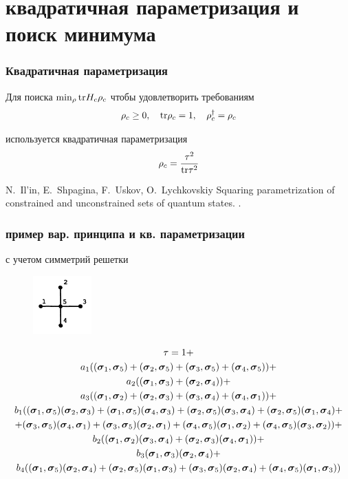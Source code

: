 \documentclass{beamer}
\begin{document}
\section{квадратичная параметризация и поиск минимума}
\begin{frame}
\frametitle{Квадратичная параметризация}
Для поиска $\min_\rho \tr H_c\rho_c$ чтобы удовлетворить требованиям 
$$\rho_c \geq 0,\quad \tr \rho_c=1, \quad \rho_c^\dagger=\rho_c$$ 

используется квадратичная параметризация 
$$\rho_c = \frac{\tau^2}{\tr \tau^2}$$

\footnotesize{
\begin{thebibliography}{99}
N.~Il'in, E.~Shpagina, F.~Uskov, O.~Lychkovskiy
\newblock Squaring parametrization of constrained and
  unconstrained sets of quantum states.
.
\end{thebibliography}
}

\end{frame}
\begin{frame}
\frametitle{пример вар. принципа и кв. параметризации}
с учетом симметрий решетки
\begin{figure}
\includegraphics[width=0.2\textwidth]{cluster-crest.png}
\end{figure}

\small
$$\begin{gathered}
\tau=1 + \\
a_1 ((\cc_1, \cc_5) + (\cc_2, \cc_5) + (\cc_3, \cc_5) + (\cc_4, \cc_5)) + \\
a_2 ((\cc_1, \cc_3) + (\cc_2, \cc_4)) + \\
a_3 ((\cc_1, \cc_2) + (\cc_2, \cc_3) + (\cc_3, \cc_4) + (\cc_4, \cc_1)) + \\
b_1 ((\cc_1, \cc_5) (\cc_2, \cc_3) + (\cc_1, \cc_5) (\cc_4, \cc_3) + (\cc_2, \cc_5) (\cc_3, \cc_4) + (\cc_2, \cc_5) (\cc_1, \cc_4) + \\
+ (\cc_3, \cc_5) (\cc_4, \cc_1) + (\cc_3, \cc_5) (\cc_2, \cc_1) + (\cc_4, \cc_5) (\cc_1, \cc_2) + (\cc_4, \cc_5) (\cc_3, \cc_2)) + \\
b_2 ((\cc_1, \cc_2) (\cc_3, \cc_4) + (\cc_2, \cc_3) (\cc_4, \cc_1)) + \\
b_3 (\cc_1, \cc_3) (\cc_2, \cc_4) + \\
b_4 ((\cc_1, \cc_5) (\cc_2, \cc_4) + (\cc_2, \cc_5) (\cc_1, \cc_3) + (\cc_3, \cc_5) (\cc_2, \cc_4) + (\cc_4, \cc_5) (\cc_1, \cc_3))
\end{gathered}$$

\normalsize
\end{frame}
\end{document}
